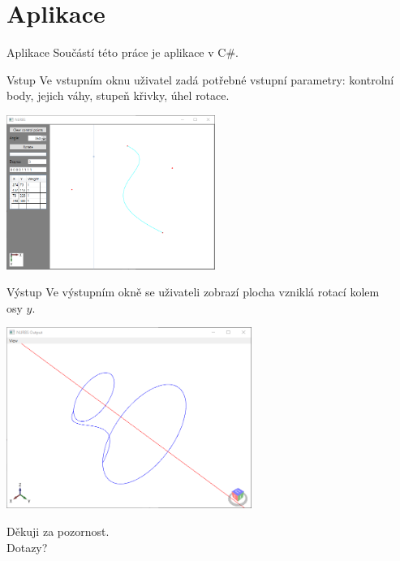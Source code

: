 \documentclass[hyperref={unicode}]{beamer}
\begin{document}
\section{Aplikace}
\begin{frame}{Aplikace}
Součástí této práce je aplikace v C\#.
\\\medskip
\begin{block}{Vstup}
Ve vstupním oknu uživatel zadá potřebné vstupní parametry: kontrolní body, jejich váhy, stupeň křivky, úhel rotace.
\begin{center}
\includegraphics[width=6.8cm]{obrazky/screenshot-input.png}
\end{center}
\end{block}
\end{frame}

\begin{frame}
\begin{block}{Výstup}
Ve výstupním okně se uživateli zobrazí plocha vzniklá rotací kolem\\ osy $y$.
\begin{center}
	\includegraphics[width=8cm]{obrazky/screenshot-output.png}
\end{center}
\end{block}
\end{frame}

\appendix
\begin{frame}
	\begin{center}
		{\huge Děkuji za pozornost.
		\\\bigskip
		Dotazy?}
	\end{center}
\end{frame}
\end{document}
